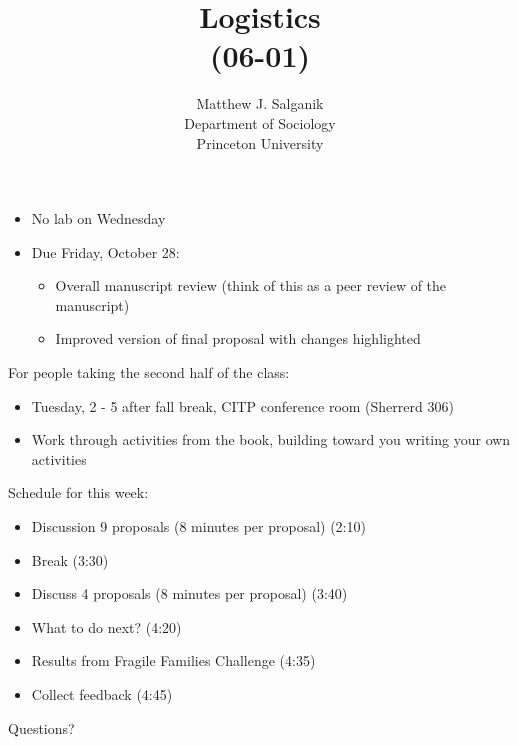 \documentclass[aspectratio=169]{beamer}
\title[]{Logistics\\(06-01)}
\author[]{Matthew J. Salganik\\Department of Sociology\\Princeton University}
\date[]{Soc 596: Computational Social Science\\Fall 2016
\vfill
\begin{flushright}
\vspace{0.6in}
\texttt{[image: figures/cc.png]}
\end{flushright}
}
\def\vf{\vfill}
\begin{document}
\frame{\titlepage}
\begin{frame}

\begin{itemize}
\item No lab on Wednesday
\item Due Friday, October 28:
\begin{itemize}
\item Overall manuscript review (think of this as a peer review of the manuscript)
\item Improved version of final proposal with changes highlighted
\end{itemize}
\end{itemize}

\end{frame}
\begin{frame}

For people taking the second half of the class:
\begin{itemize}
\item Tuesday, 2 - 5 after fall break, CITP conference room (Sherrerd 306)
\item Work through activities from the book, building toward you writing your own activities
\end{itemize}

\end{frame}
\begin{frame}

Schedule for this week:
\begin{itemize}
\item Discussion 9 proposals (8 minutes per proposal) (2:10)
\item Break (3:30)
\item Discuss 4 proposals (8 minutes per proposal) (3:40)
\item What to do next? (4:20)
\item Results from Fragile Families Challenge (4:35)
\item Collect feedback (4:45)
\end{itemize}

\vf
Questions?

\end{frame}
\end{document}
